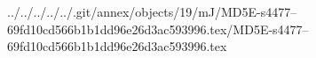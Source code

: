 ../../../../../.git/annex/objects/19/mJ/MD5E-s4477--69fd10cd566b1b1dd96e26d3ac593996.tex/MD5E-s4477--69fd10cd566b1b1dd96e26d3ac593996.tex